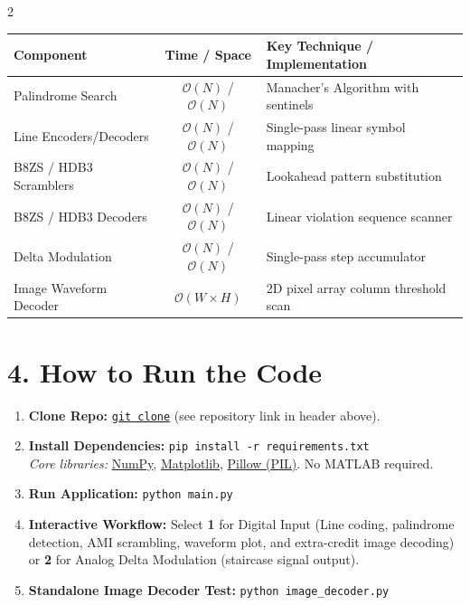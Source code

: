 \documentclass[8.5pt,a4paper]{article}
\begin{document}
\begin{multicols}{2}
\noindent
\begin{tabularx}{\linewidth}{@{} l c X @{}}
\toprule
\textbf{Component} & \textbf{Time / Space} & \textbf{Key Technique / Implementation} \\
\midrule
Palindrome Search & $\mathcal{O}(N)$ / $\mathcal{O}(N)$ & Manacher's Algorithm with sentinels \\
Line Encoders/Decoders & $\mathcal{O}(N)$ / $\mathcal{O}(N)$ & Single-pass linear symbol mapping \\
B8ZS / HDB3 Scramblers & $\mathcal{O}(N)$ / $\mathcal{O}(N)$ & Lookahead pattern substitution \\
B8ZS / HDB3 Decoders & $\mathcal{O}(N)$ / $\mathcal{O}(N)$ & Linear violation sequence scanner \\
Delta Modulation & $\mathcal{O}(N)$ / $\mathcal{O}(N)$ & Single-pass step accumulator \\
Image Waveform Decoder & $\mathcal{O}(W\!\times\! H)$ & 2D pixel array column threshold scan \\
\bottomrule
\end{tabularx}
\vspace{2.5pt}

\section{4. How to Run the Code}
\begin{enumerate}
    \item \textbf{Clone Repo:} \href{https://github.com/Roshae276/DATA_COMM_PROGRAMMING_ASSIGNMENT}{\texttt{git clone}} (see repository link in header above).
    \item \textbf{Install Dependencies:} \texttt{pip install -r requirements.txt}\\
    \textit{Core libraries:} \href{https://numpy.org/}{NumPy}, \href{https://matplotlib.org/}{Matplotlib}, \href{https://pillow.readthedocs.io/}{Pillow (PIL)}. No MATLAB required.
    \item \textbf{Run Application:} \texttt{python main.py}
    \item \textbf{Interactive Workflow:} Select \textbf{1} for Digital Input (Line coding, palindrome detection, AMI scrambling, waveform plot, and extra-credit image decoding) or \textbf{2} for Analog Delta Modulation (staircase signal output).
    \item \textbf{Standalone Image Decoder Test:} \texttt{python image\_decoder.py}
\end{enumerate}


\end{multicols}
\end{document}
